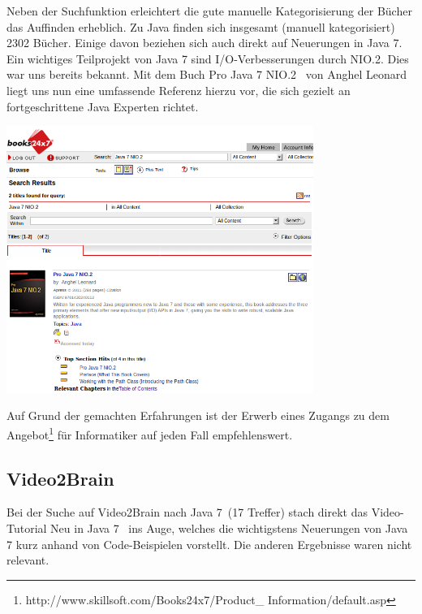 Neben der Suchfunktion erleichtert die gute manuelle Kategorisierung der Bücher das Auffinden erheblich. Zu Java finden sich insgesamt (manuell kategorisiert) 2302 Bücher. Einige davon beziehen sich auch direkt auf Neuerungen in Java 7.\\

Ein wichtiges Teilprojekt von Java 7 sind I/O-Verbesserungen durch NIO.2. Dies war uns bereits bekannt. Mit dem Buch \glqq Pro Java 7 NIO.2\grqq\cite{b247nio2} ~von Anghel Leonard liegt uns nun eine umfassende Referenz hierzu vor, die sich gezielt an fortgeschrittene Java Experten richtet.

\begin{center}
\includegraphics[width=10cm]{images/books247.png}
\end{center}

Auf Grund der gemachten Erfahrungen ist der Erwerb eines Zugangs zu dem Angebot\footnote{http://www.skillsoft.com/Books24x7/Product\_ Information/default.asp} für Informatiker auf jeden Fall empfehlenswert.

\subsection{Video2Brain}
Bei der Suche auf Video2Brain nach \glqq Java 7\grqq~(17 Treffer) stach direkt das Video-Tutorial \glqq Neu in Java 7\grqq\cite{v2bJava7}~
ins Auge, welches die wichtigstens Neuerungen von Java 7 kurz anhand von Code-Beispielen vorstellt.
Die anderen Ergebnisse waren nicht relevant.
%




